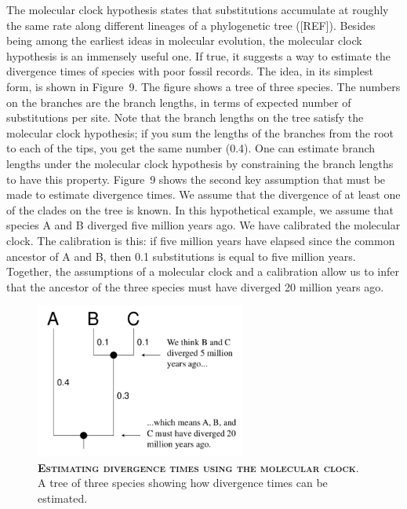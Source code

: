 \documentclass{svmult}
\begin{document}
The molecular clock hypothesis states that substitutions accumulate at roughly the same rate along
different lineages of a phylogenetic tree ([REF]).  Besides being among the earliest ideas in
molecular evolution, the molecular clock hypothesis is an immensely useful one. If true, it
suggests a way to estimate the divergence times of species with poor fossil records. The idea, in
its simplest form, is shown in Figure~9. The figure shows a tree of three species. The numbers on
the branches are the branch lengths, in terms of expected number of substitutions per site.  Note
that the branch lengths on the tree satisfy the molecular clock hypothesis; if you sum the lengths
of the branches from the root to each of the tips, you get the same number (0.4). One can estimate
branch lengths under the molecular clock hypothesis by constraining the branch lengths to have this
property. Figure~9 shows the second key assumption that must be made to estimate divergence times.
We assume that the divergence of at least one of the clades on the tree is known. In this
hypothetical example, we assume that species A and B diverged five million years ago. We have
calibrated the molecular clock. The calibration is this: if five million years have elapsed since
the common ancestor of A and B, then 0.1 substitutions is equal to five million years. Together,
the assumptions of a molecular clock and a calibration allow us to infer that the ancestor of the
three species must have diverged 20 million years ago.

\begin{figure}[t]
\centering
\includegraphics[height=2in]{fig9}
\caption{\textbf{\textsc{Estimating divergence times using the molecular clock}}.
A tree of three species showing how divergence times can be estimated.}
\label{fig9}
\end{figure}
\end{document}

